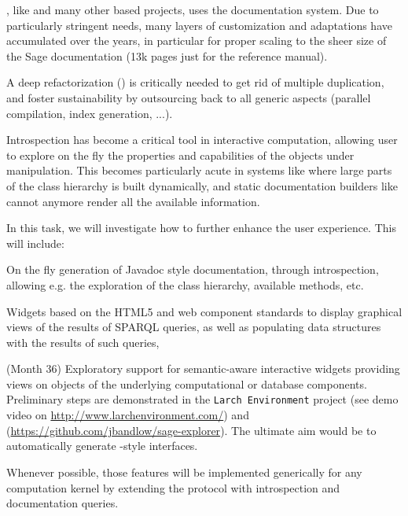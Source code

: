 \begin{workpackage}
\begin{tasklist}
\begin{task}[id=sage-sphinx, title=Refactor \Sage's \Sphinx documentation system, lead=PS,PM=6, partners={SR,UV}, wphases=0-36]
  \Sage, like \Python and many other \Python based projects, uses the
  \Sphinx documentation system. Due to particularly stringent needs,
  many layers of customization and adaptations have accumulated over
  the years, in particular for proper scaling to the sheer size of the
  Sage documentation (13k pages just for the reference manual).

  A deep refactorization () is critically needed to get rid of multiple
  duplication, and foster sustainability by outsourcing back to \Sphinx
  all generic aspects (parallel compilation, index generation, ...).
\end{task}

\begin{task}[id=dynamic-inspect,title=Dynamic documentation and exploration system,lead=PS, partners={SR,USO,UV,LL}, PM=6, wphases=0-12]
  Introspection has become a critical tool in interactive computation,
  allowing user to explore on the fly the properties and capabilities
  of the objects under manipulation. This becomes particularly acute
  in systems like \Sage where large parts of the class hierarchy is
  built dynamically, and static documentation builders like \Sphinx
  cannot anymore render all the available information.

  In this task, we will investigate how to further enhance the user
  experience. This will include:
  \begin{compactitem}
  \item On the fly generation of Javadoc style documentation, through
    introspection, allowing e.g. the exploration of the class
    hierarchy, available methods, etc.
  \item Widgets based on the HTML5 and web component standards to display
    graphical views of the results of SPARQL queries, as well as populating data
    structures with the results of such queries,
  \item {} (Month 36)
    Exploratory support for semantic-aware interactive widgets
    providing views on objects of the underlying computational or
    database components. Preliminary steps are demonstrated in the
    \texttt{Larch Environment} project (see demo video on
    \url{http://www.larchenvironment.com/}) and
    (\url{https://github.com/jbandlow/sage-explorer}). The ultimate
    aim would be to automatically generate \LMFDB-style interfaces.
  \end{compactitem}
  Whenever possible, those features will be implemented generically
  for any computation kernel by extending the \Jupyter protocol with
  introspection and documentation queries.
\end{task}


\end{tasklist}
\end{workpackage}
